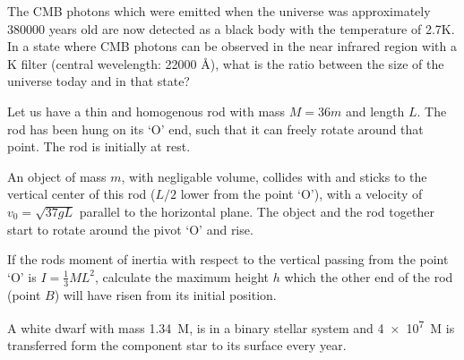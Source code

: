 \documentclass[11pt, a4paper]{exam}
\begin{document}
\begin{questions}
		
		\question
		The CMB photons which were emitted when the universe was approximately 380000 years old are now detected as a black body with the temperature of 2.7K. In a state where CMB photons can be observed in the near infrared region with a K filter (central wevelength: 22000 \AA), what is the ratio between the size of the universe today and in that state?
		
		\question
		Let us have a thin and homogenous rod with mass $M = 36m$ and length $L$. The rod has been hung on its `O' end, such that it can freely rotate around that point. The rod is initially at rest.
		
		An object of mass $m$, with negligable volume, collides with and sticks to the vertical center of this rod ($L/2$ lower from the point `O'), with a velocity of $v_0 = \sqrt{37gL}$ parallel to the horizontal plane. The object and the rod together start to rotate around the pivot `O' and rise.
		
		If the rods moment of inertia with respect to the vertical passing from the point `O' is $I = \frac{1}{3}ML^2$, calculate the maximum height $h$ which the other end of the rod (point $B$) will have risen from its initial position.
		
		\question
		A white dwarf with mass \SI{1.34}{M_\odot}, is in a binary stellar system and \SI{4e7}{M_\odot} is transferred form the component star to its  surface every year.
\end{questions}
\end{document}
